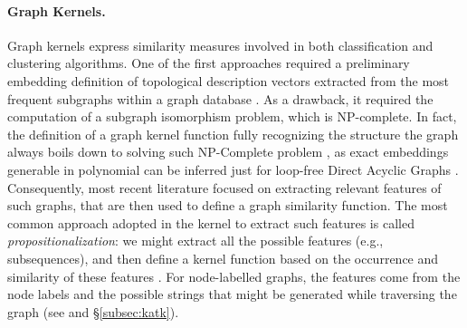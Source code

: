 \paragraph*{Graph Kernels.} Graph kernels express similarity measures \cite{Samatova} involved in both classification \cite{TsudaS10} and clustering algorithms. One of the first approaches required a preliminary embedding definition of topological description vectors extracted from the most frequent subgraphs within a graph database \cite{Sidere}. As a drawback, it required the computation of a subgraph isomorphism problem, which is NP-complete. In fact, the definition of a graph kernel function fully recognizing the structure the graph always boils down to solving such NP-Complete problem \cite{GartnerFW03}, as exact embeddings generable in polynomial can be inferred just for loop-free Direct Acyclic Graphs \cite{BergamiBM20}. Consequently, most recent literature focused on extracting relevant features of such graphs, that are then used to define a graph similarity function. The most common approach adopted in the kernel to extract such features is called \textit{propositionalization}: we might extract all the possible features (e.g., subsequences), and then define a kernel function based on the occurrence and similarity of these features \cite{Gartner03}. For node-labelled graphs, the features come from the node labels and the possible strings that might be generated while traversing the graph (see \cite{Gartner03} and \S\ref{subsec:katk}). 